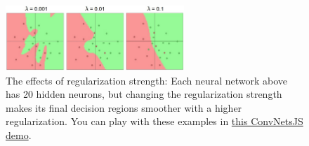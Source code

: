 \begin{figure}[h]
  \centering
  \includegraphics[width=0.6\textwidth]{Images/nn/4.jpeg}
  \caption{The effects of regularization strength: Each neural network above has 20 hidden neurons, but changing the regularization strength makes its final decision regions smoother with a higher regularization. You can play with these examples in \href{http://cs.stanford.edu/people/karpathy/convnetjs/demo/classify2d.html}{this ConvNetsJS demo}.}
    \label{fig:nn_reg}
\end{figure}
